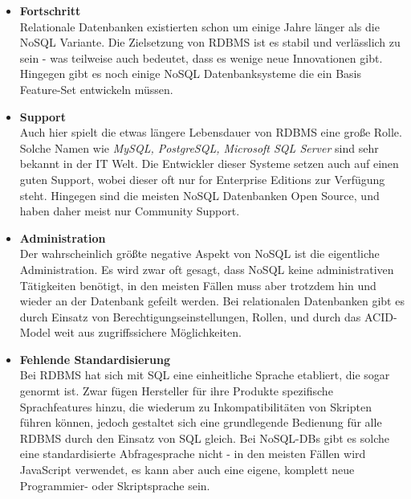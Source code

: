 \begin{itemize}
	\item \textbf{Fortschritt\\}
	Relationale Datenbanken existierten schon um einige Jahre länger als die NoSQL Variante. Die Zielsetzung von RDBMS ist es stabil und verlässlich zu sein - was teilweise auch bedeutet, dass es wenige neue Innovationen gibt. Hingegen gibt es noch einige NoSQL Datenbanksysteme die ein Basis Feature-Set entwickeln müssen.

	\item \textbf{Support\\}
	Auch hier spielt die etwas längere Lebensdauer von RDBMS eine große Rolle. Solche Namen wie \textit{MySQL, PostgreSQL, Microsoft SQL Server} sind sehr bekannt in der IT Welt. Die Entwickler dieser Systeme setzen auch auf einen guten Support, wobei dieser oft nur for Enterprise Editions zur Verfügung steht. Hingegen sind die meisten NoSQL Datenbanken Open Source, und haben daher meist nur Community Support.

	\item \textbf{Administration\\}
	Der wahrscheinlich größte negative Aspekt von NoSQL ist die eigentliche Administration. Es wird zwar oft gesagt, dass NoSQL keine administrativen Tätigkeiten benötigt, in den meisten Fällen muss aber trotzdem hin und wieder an der Datenbank gefeilt werden. Bei relationalen Datenbanken gibt es durch Einsatz von Berechtigungseinstellungen, Rollen, und durch das ACID-Model weit aus zugriffssichere Möglichkeiten.

	\item \textbf{Fehlende Standardisierung\\}
	Bei RDBMS hat sich mit SQL eine einheitliche Sprache etabliert, die sogar genormt ist. Zwar fügen Hersteller für ihre Produkte spezifische Sprachfeatures hinzu, die wiederum zu Inkompatibilitäten von Skripten führen können, jedoch gestaltet sich eine grundlegende Bedienung für alle RDBMS durch den Einsatz von SQL gleich. Bei NoSQL-DBs gibt es solche eine standardisierte Abfragesprache nicht - in den meisten Fällen wird JavaScript verwendet, es kann aber auch eine eigene, komplett neue Programmier- oder Skriptsprache sein.
\end{itemize}

\clearpage